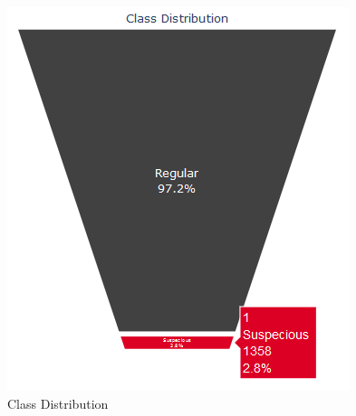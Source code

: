 \begin{figure}[H]
    \centering
    \includegraphics[width=.8\linewidth]{figures/class_imbalance.png}
    \caption{Class Distribution}
    \label{fig:class distribution}
\end{figure}

